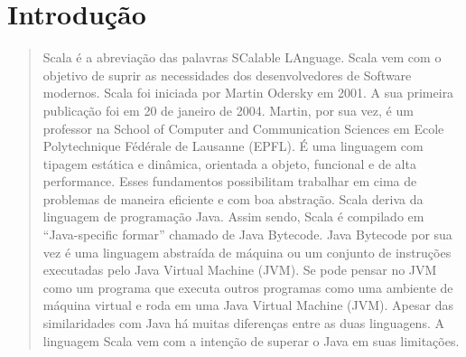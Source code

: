 

\chapter{ Introdu\c{c}\~{a}o}


\begin{quote}



   Scala é a abreviação das palavras SCalable LAnguage. Scala vem com o objetivo de suprir as necessidades dos desenvolvedores de Software modernos. Scala foi iniciada por Martin Odersky em 2001. A sua primeira publicação foi em 20 de janeiro de 2004. Martin, por sua vez, é um professor na  School of Computer and Communication Sciences em Ecole Polytechnique Fédérale de Lausanne (EPFL). É uma linguagem com tipagem estática e dinâmica, orientada a objeto, funcional e de alta performance. Esses fundamentos possibilitam trabalhar em cima de problemas de maneira eficiente e com boa abstração.
   Scala deriva da linguagem de programação Java. Assim sendo, Scala é compilado em “Java-specific formar”  chamado de Java Bytecode.  Java Bytecode por sua vez é uma linguagem abstraída de máquina ou um conjunto de instruções executadas pelo Java Virtual Machine (JVM). Se pode pensar no JVM como um programa que executa outros programas como uma ambiente de máquina virtual  e roda em uma Java Virtual Machine (JVM).
   Apesar das similaridades com Java há muitas diferenças entre as duas linguagens. A linguagem Scala vem com a intenção de superar o Java em suas limitações.
\end{quote}

